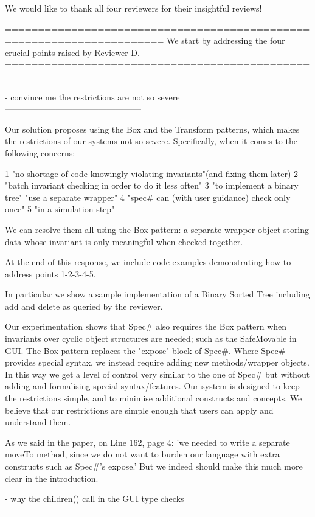 We would like to thank all four reviewers for their insightful reviews!

======================================================================
We start by addressing the four crucial points raised by Reviewer D.
======================================================================


- convince me the restrictions are not so severe
------------------------------------------------

Our solution proposes using the Box and the Transform patterns, which makes the restrictions of our systems not so severe. Specifically, when it comes to the following concerns:

1 "no shortage of code knowingly violating invariants"(and fixing them later)
2 "batch invariant checking in order to do it less often"
3 "to implement a binary tree" "use a separate wrapper"
4 "spec# can (with user guidance) check only once"
5 "in a simulation step"

We can resolve them all using the Box pattern: a separate wrapper object storing data whose invariant
is only meaningful when checked together.

At the end of this response, we include code examples demonstrating how to address points 1-2-3-4-5.

In particular we show a sample implementation of a Binary Sorted Tree including add and delete as queried by the reviewer.

Our experimentation shows that Spec# also requires the Box pattern when
invariants over cyclic object structures are needed; such as the SafeMovable in GUI.
The Box pattern replaces the "expose" block of Spec#.
Where Spec# provides special syntax, we instead require adding new methods/wrapper
objects. In this way we get a level of control very similar to the one of Spec#
but without adding and formalising special syntax/features.
Our system is designed to keep the restrictions simple, and to minimise additional constructs and concepts.
We believe that our restrictions are simple enough that users can apply and understand them.

As we said in the paper, on Line 162, page 4: 'we needed to write a separate moveTo method, since we do not want to burden our language with extra constructs such as Spec#’s expose.' But we indeed should make this much more clear in the introduction.


- why the children() call in the GUI type checks
------------------------------------------------

